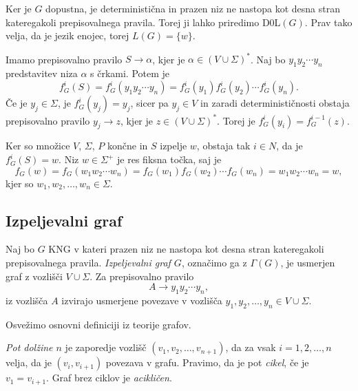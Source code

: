 \documentclass[fin1, tisk]{fmfdelo}
\theoremstyle{definition}
\begin{document}
\begin{dokaz}
    Ker je $G$ dopustna, je deterministična in prazen niz ne nastopa kot desna stran kateregakoli
    prepisovalnega pravila. Torej ji lahko priredimo D$0$L$(G)$. Prav tako velja, da je jezik 
    enojec, torej $L(G) = \{ w \}$.
    
    Imamo prepisovalno pravilo $S \rightarrow \alpha$, kjer je $\alpha \in (V \cup \Sigma)^*$.
    Naj bo $y_1 y_2 \cdots y_n$ predstavitev niza $\alpha$ s črkami. Potem je
    \[
        f^i_G(S) = f^i_G(y_1 y_2 \cdots y_n) = f^i_G(y_1)f^i_G(y_2) \cdots f^i_G(y_n).
    \]
    Če je $y_j \in \Sigma$, je $f^i_G(y_j) = y_j$, sicer pa $y_j \in V$ in zaradi 
    determinističnosti obstaja prepisovalno pravilo $y_j \rightarrow z$, kjer je 
    $z \in (V \cup \Sigma)^*$. Torej je $f^i_G(y_i) = f^{i-1}_G(z)$. 
    
    Ker so množice $V$, $\Sigma$, $P$ končne in $S$ izpelje $w$, obstaja tak $i \in N$, da je 
    $f^i_G(S) = w$. Niz $ w \in \Sigma^+ $ je res fiksna točka, saj je 
    \[
        f_G(w) = f_G(w_1w_2 \cdots w_n) = f_G(w_1)f_G(w_2) \cdots f_G(w_n) = w_1w_2 \cdots w_n = w,
    \]
    kjer so $w_1, w_2, \ldots, w_n \in \Sigma$.
\end{dokaz}

\subsection{Izpeljevalni graf}

\begin{definicija}
    Naj bo $G$ KNG v kateri prazen niz ne nastopa kot desna stran kateregakoli
    prepisovalnega pravila. \emph{Izpeljevalni graf $G$}, označimo ga z $\Gamma(G)$, je 
    usmerjen graf z vozlišči $ V \cup \Sigma $. Za prepisovalno pravilo
    \[    
        A \rightarrow y_1 y_2 \cdots y_n,
    \]
    iz vozlišča $A$ izvirajo usmerjene povezave v vozlišča $y_1, y_2, \ldots, y_n \in V \cup \Sigma$.
\end{definicija}

Osvežimo osnovni definiciji iz teorije grafov.

\begin{definicija}
    \emph{Pot dolžine $n$} je zaporedje vozlišč $(v_1, v_2, \ldots, v_{n+1})$, da za vsak 
    $i = 1, 2, \ldots, n$ velja, da je $(v_i,v_{i+1})$ povezava v grafu. 
    Pravimo, da je pot \emph{cikel}, če je $v_1 = v_{i+1}$. Graf brez ciklov je \emph{acikličen}.
\end{definicija}
\end{document}
